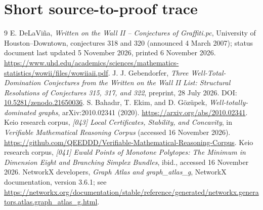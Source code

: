 \documentclass[11pt,a4paper]{article}
\theoremstyle{definition}\newtheorem{definition}[theorem]{Definition}
\theoremstyle{remark}\newtheorem{remark}[theorem]{Remark}
\newcommand{\Gbar}{\overline G}
\newcommand{\epar}{\mathsf E}
\begin{document}
\section{Short source-to-proof trace}
\begin{center}
\end{center}

\begin{thebibliography}{9}
E. DeLaVi\~na, \emph{Written on the Wall II -- Conjectures of Graffiti.pc}, University of Houston--Downtown, conjectures 318 and 320 (announced 4 March 2007); status document last updated 5 November 2026, printed 6 November 2026.\newline
\url{https://www.uhd.edu/academics/sciences/mathematics-statistics/wowii/files/wowiiaii.pdf}.
J. J. Gebendorfer, \emph{Three Well-Total-Domination Conjectures from the Written on the Wall II List: Structural Resolutions of Conjectures 315, 317, and 322}, preprint, 28 July 2026. DOI: \href{https://doi.org/10.5281/zenodo.21650036}{10.5281/zenodo.21650036}.
S. Bahad\i r, T. Ekim, and D. G\"oz\"upek, \emph{Well-totally-dominated graphs}, arXiv:2010.02341 (2020).\newline
\url{https://arxiv.org/abs/2010.02341}.
Keio research corpus, \emph{[043] Local Certificates, Stability, and Concavity}, in \emph{Verifiable Mathematical Reasoning Corpus} (accessed 16 November 2026).\newline
\url{https://github.com/QEEDDD/Verifiable-Mathematical-Reasoning-Corpus}.
Keio research corpus, \emph{[041] Ewald Points of Monotone Polytopes: The Minimum in Dimension Eight and Branching Simplex Bundles}, ibid., accessed 16 November 2026.
NetworkX developers, \emph{Graph Atlas and graph\_atlas\_g}, NetworkX documentation, version 3.6.1; see \url{https://networkx.org/documentation/stable/reference/generated/networkx.generators.atlas.graph_atlas_g.html}.
\end{thebibliography}
\end{document}
